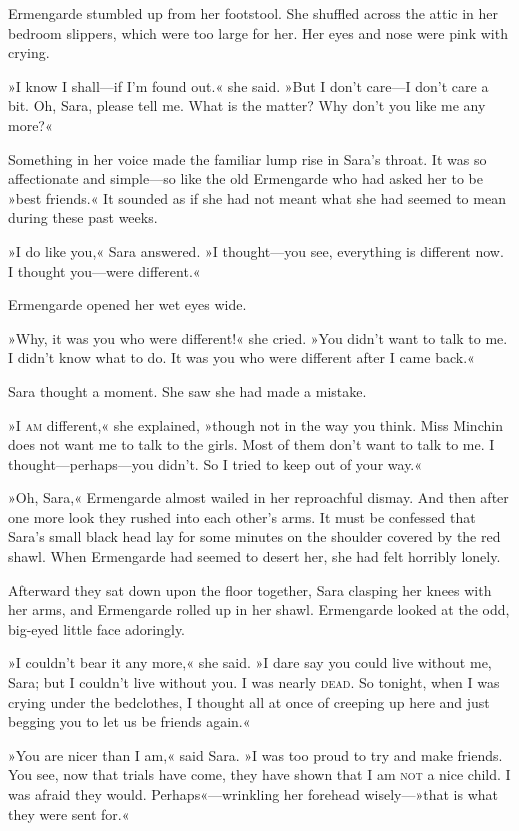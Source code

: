 Ermengarde stumbled up from her footstool. She shuffled across the attic in her bedroom slippers, which were too large for her. Her eyes and nose were pink with crying.

»I know I shall—if I'm found out.« she said. »But I don't care—I don't care a bit. Oh, Sara, please tell me. What is the matter? Why don't you like me any more?«

Something in her voice made the familiar lump rise in Sara's throat. It was so affectionate and simple—so like the old Ermengarde who had asked her to be »best friends.« It sounded as if she had not meant what she had seemed to mean during these past weeks.

»I do like you,« Sara answered. »I thought—you see, everything is different now. I thought you—were different.«

Ermengarde opened her wet eyes wide.

»Why, it was you who were different!« she cried. »You didn't want to talk to me. I didn't know what to do. It was you who were different after I came back.«

Sara thought a moment. She saw she had made a mistake.

»I \textsc{am} different,« she explained, »though not in the way you think. Miss Minchin does not want me to talk to the girls. Most of them don't want to talk to me. I thought—perhaps—you didn't. So I tried to keep out of your way.«

»Oh, Sara,« Ermengarde almost wailed in her reproachful dismay. And then after one more look they rushed into each other's arms. It must be confessed that Sara's small black head lay for some minutes on the shoulder covered by the red shawl. When Ermengarde had seemed to desert her, she had felt horribly lonely.

Afterward they sat down upon the floor together, Sara clasping her knees with her arms, and Ermengarde rolled up in her shawl. Ermengarde looked at the odd, big-eyed little face adoringly.

»I couldn't bear it any more,« she said. »I dare say you could live without me, Sara; but I couldn't live without you. I was nearly \textsc{dead}. So tonight, when I was crying under the bedclothes, I thought all at once of creeping up here and just begging you to let us be friends again.«

»You are nicer than I am,« said Sara. »I was too proud to try and make friends. You see, now that trials have come, they have shown that I am \textsc{not} a nice child. I was afraid they would. Perhaps«—wrinkling her forehead wisely—»that is what they were sent for.«

